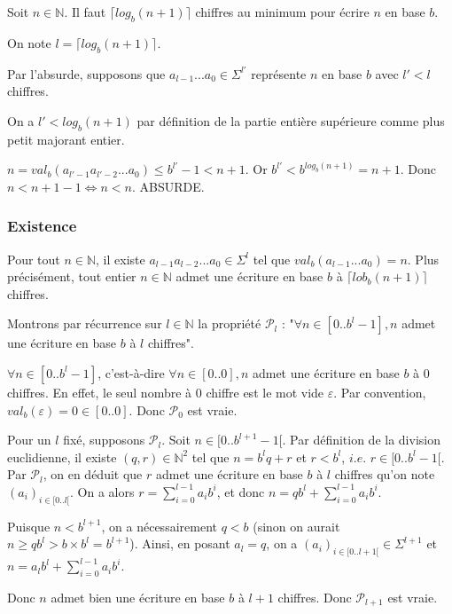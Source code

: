 \documentclass{scrartcl}
\begin{document}
				\noindent \prop Soit $n \in \mathbb{N}$. \newline
				Il faut $\lceil log_b(n+1) \rceil$ chiffres au minimum pour écrire $n$ en base $b$.

				\begin{demo}
					\item
						On note $l = \lceil log_b(n+1) \rceil$.

						Par l'absurde, supposons que $a_{l-1}...a_0 \in \Sigma^{l'}$ représente $n$ en base $b$ avec $l' < l$ chiffres.

						On a $l' < log_b(n+1)$ par définition de la partie entière supérieure comme plus petit majorant entier.

						$n = val_b(a_{l'-1}a_{l'-2}...a_0) \leqslant b^{l'}-1 < n+1$.
						Or $b^{l'} < b^{log_b(n+1)} = n+1$.
						Donc $n < n+1-1 \iff n < n$. ABSURDE.
				\end{demo}

			\subsubsection{Existence}

				\noindent \rem Pour tout $n \in \mathbb{N}$, il existe $a_{l-1}a_{l-2}...a_0 \in \Sigma^l$ tel que
				$val_b(a_{l-1}...a_0) = n$. Plus précisément, tout entier $n \in \mathbb{N}$ admet une écriture en base $b$
				à $\lceil lob_b(n+1) \rceil$ chiffres.

				\begin{demo}
					\item
						Montrons par récurrence sur $l \in \mathbb{N}$ la propriété $\mathcal{P}_l$ :
						"$\forall n \in [0..b^l-1], n$ admet une écriture en base $b$ à $l$ chiffres".

						$\forall n \in [0..b^l-1]$, c'est-à-dire $\forall n \in [0..0], n$ admet une écriture en base $b$ à $0$ chiffres.
						En effet, le seul nombre à $0$ chiffre est le mot vide $\varepsilon$.
						Par convention, $val_b(\varepsilon) = 0 \in [0..0]$.
						Donc $\mathcal{P}_0$ est vraie.

						Pour un $l$ fixé, supposons $\mathcal{P}_l$. Soit $n \in [0..b^{l+1}-1[$.
						Par définition de la division euclidienne, il existe $(q,r) \in \mathbb{N}^2$ tel que
						$n = b^lq+r$ et $r < b^l$, $i.e.$ $r \in [0..b^l-1[$.
						Par $\mathcal{P}_l$, on en déduit que $r$ admet une écriture en base $b$ à $l$ chiffres qu'on note $(a_i)_{i \in [0..l[}$.
						On a alors $r = \sum_{i=0}^{l-1} a_ib^i$, et donc $n=qb^l + \sum_{i=0}^{l-1} a_ib^i$.

						Puisque $n < b^{l+1}$, on a nécessairement $q < b$ (sinon on aurait $n \geqslant qb^l > b \times b^l = b^{l+1}$).
						Ainsi, en posant $a_l = q$, on a $(a_i)_{i \in [0..l+1[} \in \Sigma^{l+1}$ et $n = a_lb^l + \sum_{i=0}^{l-1} a_ib^i$.

						Donc $n$ admet bien une écriture en base $b$ à $l+1$ chiffres. Donc $\mathcal{P}_{l+1}$ est vraie.
				\end{demo}
\end{document}
